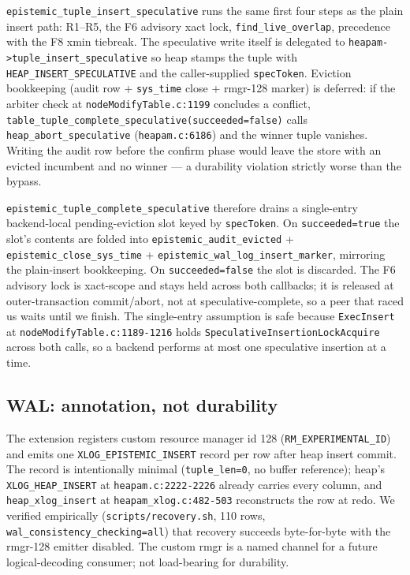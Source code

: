\documentclass[sigconf, nonacm]{acmart}
\begin{document}
\texttt{epistemic\_tuple\_insert\_speculative} runs the same first four steps as the plain insert path: R1--R5, the F6 advisory xact lock, \texttt{find\_live\_overlap}, precedence with the F8 xmin tiebreak. The speculative write itself is delegated to \texttt{heapam->tuple\_insert\_speculative} so heap stamps the tuple with \texttt{HEAP\_INSERT\_SPECULATIVE} and the caller-supplied \texttt{specToken}. Eviction bookkeeping (audit row + \texttt{sys\_time} close + rmgr-128 marker) is deferred: if the arbiter check at \texttt{nodeModifyTable.c:1199} concludes a conflict, \texttt{table\_tuple\_complete\_speculative(succeeded=false)} calls \texttt{heap\_abort\_speculative} (\texttt{heapam.c:6186}) and the winner tuple vanishes. Writing the audit row before the confirm phase would leave the store with an evicted incumbent and no winner --- a durability violation strictly worse than the bypass.

\texttt{epistemic\_tuple\_complete\_speculative} therefore drains a single-entry backend-local pending-eviction slot keyed by \texttt{specToken}. On \texttt{succeeded=true} the slot's contents are folded into \texttt{epistemic\_audit\_evicted} + \texttt{epistemic\_close\_sys\_time} + \texttt{epistemic\_wal\_log\_insert\_marker}, mirroring the plain-insert bookkeeping. On \texttt{succeeded=false} the slot is discarded. The F6 advisory lock is xact-scope and stays held across both callbacks; it is released at outer-transaction commit/abort, not at speculative-complete, so a peer that raced us waits until we finish. The single-entry assumption is safe because \texttt{ExecInsert} at \texttt{nodeModifyTable.c:1189-1216} holds \texttt{SpeculativeInsertionLockAcquire} across both calls, so a backend performs at most one speculative insertion at a time.

\subsection{WAL: annotation, not durability}
\label{sec:design-wal}
The extension registers custom resource manager id 128 (\texttt{RM\_EXPERIMENTAL\_ID}) and emits one \texttt{XLOG\_EPISTEMIC\_INSERT} record per row after heap insert commit. The record is intentionally minimal (\texttt{tuple\_len=0}, no buffer reference); heap's \texttt{XLOG\_HEAP\_INSERT} at \texttt{heapam.c:2222-2226} already carries every column, and \texttt{heap\_xlog\_insert} at \texttt{heapam\_xlog.c:482-503} reconstructs the row at redo. We verified empirically (\texttt{scripts/recovery.sh}, 110 rows, \texttt{wal\_consistency\_checking=all}) that recovery succeeds byte-for-byte with the rmgr-128 emitter disabled. The custom rmgr is a named channel for a future logical-decoding consumer; not load-bearing for durability.
\end{document}
